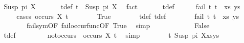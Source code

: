 \begin{isabellebody}
\ {\isacharparenleft}{\kern0pt}Susp\ pi\ X{\isacharparenright}{\kern0pt}\isanewline
\ \ \ \ \ \isamarkupfalse%
\ t{}{\isacharunderscore}{\kern0pt}def{\isacharcolon}{\kern0pt}\ {\isachardoublequoteopen}t{}\ {\isacharequal}{\kern0pt}\ Susp\ pi\ X{\isachardoublequoteclose}\ \isamarkupfalse%
\ fact\isanewline
\ \ \ \ \ \isamarkupfalse%
\ t{}{\isacharunderscore}{\kern0pt}def\isanewline
\ \ \ \ \isamarkupfalse%
\ {\isachardoublequoteopen}fail\ {\isacharparenleft}{\kern0pt}{\isacharparenleft}{\kern0pt}t{}{\isacharcomma}{\kern0pt}\ t{}{\isacharparenright}{\kern0pt}\ {\isacharhash}{\kern0pt}\ xs{\isacharcomma}{\kern0pt}\ ys{\isacharparenright}{\kern0pt}{\isachardoublequoteclose}\ \isanewline
\ \ \ \ \isamarkupfalse%
{\isacharparenleft}{\kern0pt}cases\ {\isachardoublequoteopen}occurs\ X\ t{}{\isacharprime}{\kern0pt}{\isachardoublequoteclose}{\isacharparenright}{\kern0pt}\isanewline
\ \ \ \ \ \ \isamarkupfalse%
\ True\isanewline
\ \ \ \ \ \ \isamarkupfalse%
\ t{}{\isacharunderscore}{\kern0pt}def\ t{}{\isacharunderscore}{\kern0pt}def\isanewline
\ \ \ \ \ \ \isamarkupfalse%
\ {\isachardoublequoteopen}fail\ {\isacharparenleft}{\kern0pt}{\isacharparenleft}{\kern0pt}t{}{\isacharcomma}{\kern0pt}\ t{}{\isacharparenright}{\kern0pt}\ {\isacharhash}{\kern0pt}\ xs{\isacharcomma}{\kern0pt}\ ys{\isacharparenright}{\kern0pt}{\isachardoublequoteclose}\ \isanewline
\ \ \ \ \ \ \isamarkupfalse%
\ fail{\isacharunderscore}{\kern0pt}sym{\isacharbrackleft}{\kern0pt}OF\ fail{\isacharunderscore}{\kern0pt}occur{\isacharunderscore}{\kern0pt}func{\isacharbrackleft}{\kern0pt}OF\ True{\isacharbrackright}{\kern0pt}{\isacharbrackright}{\kern0pt}\ \isamarkupfalse%
\ simp\isanewline
\ \ \ \ \isamarkupfalse%
\isanewline
\ \ \ \ \ \ \isamarkupfalse%
\ False\isanewline
\ \ \ \ \ \ \isamarkupfalse%
\ t{}{\isacharunderscore}{\kern0pt}def\ \isanewline
\ \ \ \ \ \ \isamarkupfalse%
\ not{\isacharunderscore}{\kern0pt}occurs{\isacharcolon}{\kern0pt}\ {\isachardoublequoteopen}{\isasymnot}\ occurs\ X\ t{}{\isachardoublequoteclose}\ \isamarkupfalse%
\ simp\isanewline
\ \ \ \ \ \ \isamarkupfalse%
\ {\isachardoublequoteopen}{\isacharparenleft}{\kern0pt}{\isacharparenleft}{\kern0pt}t{}{\isasymapprox}{\isacharquery}{\kern0pt}\ Susp\ pi\ X{\isacharparenright}{\kern0pt}{\isacharhash}{\kern0pt}xs{\isacharcomma}{\kern0pt}ys{\isacharparenright}{\kern0pt}\ \isanewline

\end{isabellebody}
